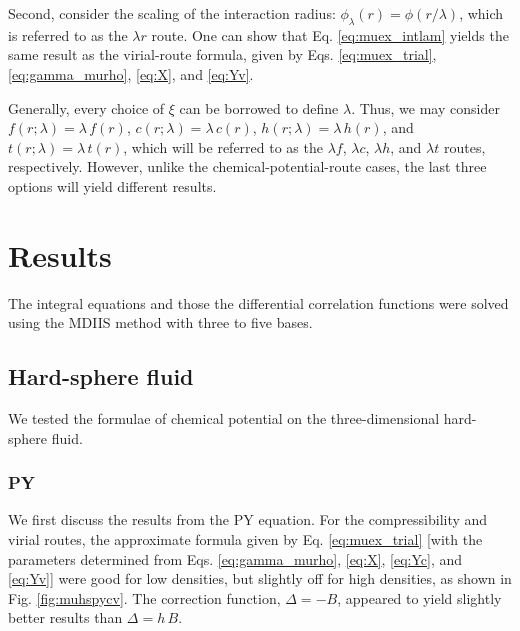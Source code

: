\documentclass[aip,jcp,reprint,superscriptaddress]{revtex4-1}
\begin{document}
Second,
consider the scaling of the interaction radius:
$\phi_\lambda(r) = \phi(r/\lambda)$,
which is referred to
as the $\lambda r$ route.
%
One can show that
Eq. \eqref{eq:muex_intlam}
yields the same result as
the virial-route formula,
given by
Eqs.
\eqref{eq:muex_trial},
\eqref{eq:gamma_murho},
\eqref{eq:X},
and
\eqref{eq:Yv}.



Generally,
every choice of $\xi$
can be borrowed to define $\lambda$.
%
Thus,
we may consider
$f(r; \lambda) = \lambda \, f(r)$,
$c(r; \lambda) = \lambda \, c(r)$,
$h(r; \lambda) = \lambda \, h(r)$,
and
$t(r; \lambda) = \lambda \, t(r)$,
%
which will be referred to as the
$\lambda f$,
$\lambda c$,
$\lambda h$,
and
$\lambda t$
routes, respectively.
%
However, unlike the chemical-potential-route cases,
the last three options will yield different results.





\section{Results}




The integral equations and
those the differential correlation functions
were solved using the MDIIS method\cite{kovalenko1999}
with three to five bases.



\subsection{Hard-sphere fluid}


We tested the formulae of chemical potential
on the three-dimensional hard-sphere fluid.



\subsubsection{PY}



We first discuss the results
from the PY equation.
%
For the compressibility and virial routes,
the approximate formula given by
Eq. \eqref{eq:muex_trial}
[with the parameters determined from
Eqs.
\eqref{eq:gamma_murho},
\eqref{eq:X},
\eqref{eq:Yc},
and
\eqref{eq:Yv}]
were good for low densities,
but slightly off for high densities,
as shown in Fig. \ref{fig:muhspycv}.
%
The correction function, $\Delta = -B$,
appeared to yield slightly better results than
$\Delta = h \, B$.
\end{document}
